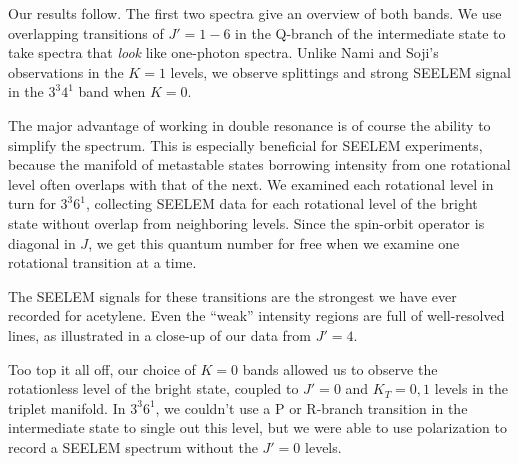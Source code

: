 \documentclass[12pt]{mitthesis}
\begin{document}
Our results follow.  The first two spectra give an overview of both
bands.  We use overlapping transitions of $J'=1-6$ in the Q-branch of
the intermediate state to take spectra that \emph{look} like
one-photon spectra.  Unlike Nami and Soji's observations in the $K=1$
levels, we observe splittings and strong SEELEM signal in the $3^3
4^1$ band when $K=0$.

The major advantage of working in double resonance is of course the
ability to simplify the spectrum.  This is especially beneficial for
SEELEM experiments, because the manifold of metastable states
borrowing intensity from one rotational level often overlaps with that
of the next.  We examined each rotational level in turn for $3^3 6^1$,
collecting SEELEM data for each rotational level of the bright state
without overlap from neighboring levels.  Since the spin-orbit
operator is diagonal in $J$, we get this quantum number for free when
we examine one rotational transition at a time.

The SEELEM signals for these transitions are the strongest we have
ever recorded for acetylene.  Even the ``weak'' intensity regions are
full of well-resolved lines, as illustrated in a close-up of our data
from $J'=4$.

Too top it all off, our choice of $K=0$ bands allowed us to observe
the rotationless level of the bright state, coupled to $J'=0$ and
$K_T=0,1$ levels in the triplet manifold.  In $3^3 6^1$, we couldn't use
a P or R-branch transition in the intermediate state to single out
this level, but we were able to use polarization to record a SEELEM
spectrum without the $J'=0$ levels.



\end{document}
